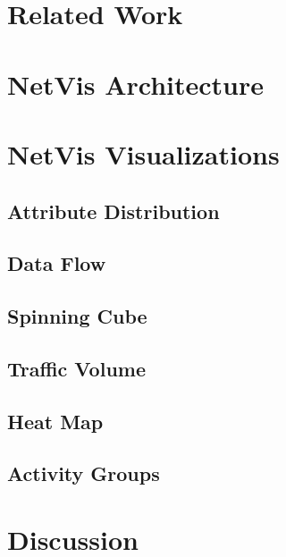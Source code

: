 \section{Related Work}


\section{NetVis Architecture}


\section{NetVis Visualizations}


\subsection{Attribute Distribution}


\subsection{Data Flow}


\subsection{Spinning Cube}


\subsection{Traffic Volume}


\subsection{Heat Map}


\subsection{Activity Groups}


\section{Discussion}


